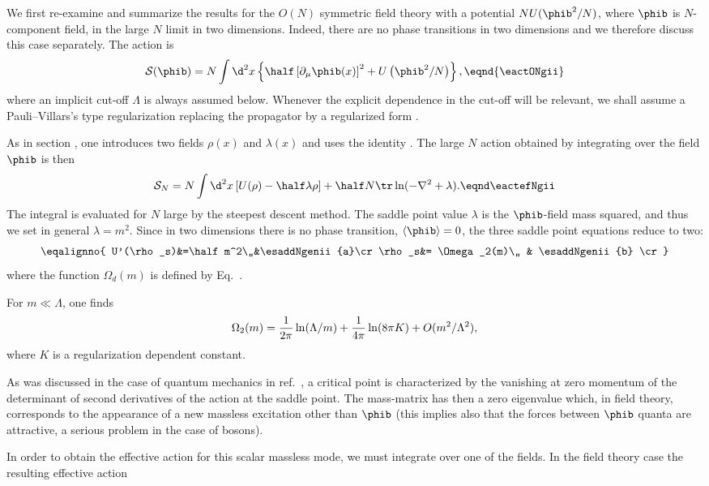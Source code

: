We first re-examine and summarize the results for the $O(N)$
symmetric field theory with a potential $NU(\phib^2/N)$, where
$\phib$ is $N$-component field, in the large $N$ limit in two
dimensions. Indeed, there are no phase transitions in two
dimensions and we therefore discuss this case separately. The
action is\sslbl\stwodim
$${\cal S}(\phib)= N\int\d^2 x \left\{\half \left[ \partial_{\mu} \phib (x)
\right]^{2} +U\left(\phib^2/N\right) \right\} ,\eqnd{\eactONgii}$$
where an implicit cut-off $\Lambda$ is always assumed below. Whenever the
explicit dependence in the cut-off will be relevant, we shall assume a
Pauli--Villars's type regularization replacing the propagator by a regularized form
\epropreg.\par
 As  in section \ssNbosgen, one introduces two fields
$\rho(x)$ and $\lambda(x)$ and uses the identity \egeniden.
The large $N$  action obtained by integrating over the field $\phib$ is then
$${\cal S}_N=N\int\d^2 x \left[U(\rho)-\half \lambda
\rho \right]+\half N \tr\ln(-\nabla^2+\lambda ).\eqnd\eactefNgii $$
%
The integral is  evaluated for $N$ large by the steepest descent method.
The saddle point value $\lambda$ is the
$\phib$-field mass squared, and thus we set in general $\lambda=m^2$.  Since in two dimensions
there is no phase transition, $\left<\phib\right>=0$, the three
saddle point equations \esaddleN{} reduce to two:
 \eqna\esaddNgenii
$$\eqalignno{
U'(\rho_s)&=\half m^2\,,&\esaddNgenii{a}\cr
\rho_s&= \Omega _2(m)\,, & \esaddNgenii{b} \cr}$$
where  the function $\Omega_d(m)$ is defined by Eq.~\etadepole.\par
For $m\ll\Lambda$, one finds
$$\Omega_2(m)={1\over2\pi}\ln(\Lambda/m)+{1\over4\pi}\ln (8\pi K)
+O(m^2/\Lambda^2) , $$
where $K$ is a regularization dependent constant.
\par
As was discussed in the case of quantum mechanics in ref.~\rEMNZJ,
a critical point is characterized by the vanishing at zero
momentum of the determinant of second derivatives of the action at
the saddle point. The mass-matrix has then a zero eigenvalue
which, in field theory, corresponds to the appearance of a new
massless excitation other than $\phib$ (this implies also that the
forces between $\phib$ quanta are attractive, a serious problem in
the case of bosons). \par
 In order to obtain the effective action
for this scalar massless mode, we must integrate over one of the
fields. In the field theory case the resulting effective action
